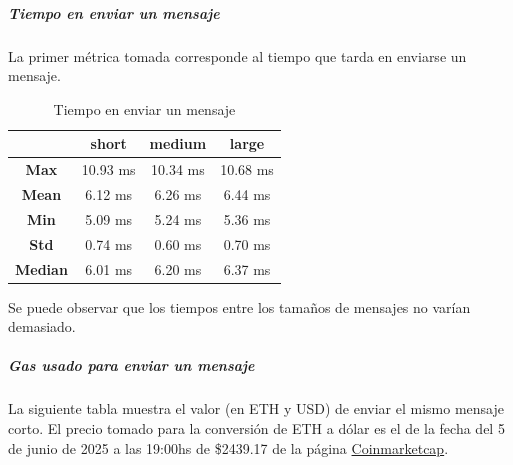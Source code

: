 \subparagraph{Tiempo en enviar un mensaje}

La primer métrica tomada corresponde al tiempo que tarda en enviarse un mensaje.

\setlength\tabcolsep{10pt}
\begin{table}[!htbp]
    \centering
    \begin{tabular}{|*4{c|}}
    \hline
    & \textbf{short} & \textbf{medium} & \textbf{large} \\
    \hline
    \textbf{Max} & 10.93 ms & 10.34 ms & 10.68 ms \\
    \hline
    \textbf{Mean} & 6.12 ms & 6.26 ms & 6.44 ms \\
    \hline
    \textbf{Min} & 5.09 ms & 5.24 ms & 5.36 ms \\
    \hline
    \textbf{Std} & 0.74 ms & 0.60 ms & 0.70 ms \\
    \hline
    \textbf{Median} & 6.01 ms & 6.20 ms & 6.37 ms\\
    \hline
    \end{tabular}
    \caption{Tiempo en enviar un mensaje}
\end{table}

Se puede observar que los tiempos entre los tamaños de mensajes no varían demasiado.

\subparagraph{Gas usado para enviar un mensaje}

La siguiente tabla muestra el valor (en ETH y USD) de enviar el mismo mensaje corto. El precio tomado para la conversión de ETH a dólar es el de la fecha del 5 de junio de 2025 a las 19:00hs de \$2439.17 de la página \href{https://coinmarketcap.com/currencies/ethereum/}{Coinmarketcap}.

